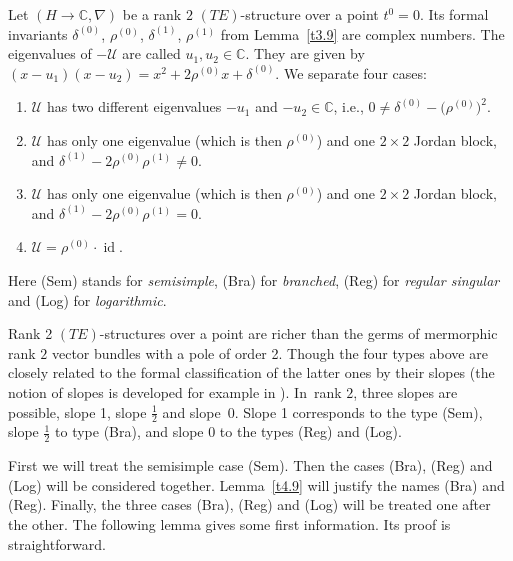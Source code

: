 \documentclass[pdftex]{sigma}%
\numberwithin{equation}{section}
\numberwithin{figure}{section}
\newcommand{\C}{{\mathbb C}}
\newcommand{\UU}{{\mathcal U}}
\newcommand{\nnn}{\nabla}
\DeclareMathOperator{\id}{id}
\begin{document}
\begin{Definition}%
Let $(H\to\C,\nnn)$ be a rank $2$ $(TE)$-structure
over a point $t^0=0$. Its formal invariants
$\delta^{(0)}$, $\rho^{(0)}$, $\delta^{(1)}$, $\rho^{(1)}$
from Lemma~\ref{t3.9} are complex numbers.
The eigenvalues of $-\UU$ are called $u_1,u_2\in\C$.
They are given by
$(x-u_1)(x-u_2)=x^2+2\rho^{(0)}x+\delta^{(0)}$.
We separate four cases:
\begin{enumerate}\itemsep=0pt\setlength{\leftskip}{0.3cm}
\item[(Sem)] $\UU$ has two different eigenvalues
$-u_1$ and $-u_2\in\C$, i.e.,
$0\neq \delta^{(0)}-\big(\rho^{(0)}\big)^2$.
\item[(Bra)] $\UU$ has only one eigenvalue
\big(which is then $\rho^{(0)}$\big)
and one $2\times 2$ Jordan block,
and $\delta^{(1)}-2\rho^{(0)}\rho^{(1)}\neq 0$.
\item[(Reg)] $\UU$ has only one eigenvalue
\big(which is then $\rho^{(0)}$\big)
and one $2\times 2$ Jordan block,
and $\delta^{(1)}-2\rho^{(0)}\rho^{(1)}= 0$.
\item[(Log)] $\UU=\rho^{(0)}\cdot\id$.
\end{enumerate}
Here (Sem) stands for {\it semisimple},
(Bra) for {\it branched}, (Reg) for {\it regular singular}
and (Log) for {\it logarithmic}.
\end{Definition}


\begin{Remark}\label{t4.2}
Rank 2 $(TE)$-structures over a point are richer than the
germs of mermorphic rank $2$ vector bundles with a pole of
order 2. Though the four types above are closely related
to the formal classification of the latter ones by their
slopes (the notion of slopes is developed for example in
\cite[Section~5]{Sa93}). In~rank $2$, three slopes are possible,
slope 1, slope $\frac{1}{2}$ and slope~0.
Slope 1 corresponds to the type (Sem), slope $\frac{1}{2}$
to type (Bra), and slope 0 to the types (Reg) and (Log).
\end{Remark}


First we will treat the semisimple case (Sem).
Then the cases (Bra), (Reg) and (Log)
will be considered together.
Lemma~\ref{t4.9} will justify the names (Bra) and (Reg).
Finally, the three cases (Bra), (Reg) and (Log) will be
treated one after the other.
The following lemma gives some first information.
Its proof is straightforward.
\end{document}
